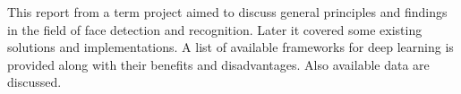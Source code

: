 This report from a term project aimed to discuss general principles and findings in the field of face detection and recognition. Later it covered some existing solutions and implementations. A list of available frameworks for deep learning is provided along with their benefits and disadvantages. Also available data are discussed.
